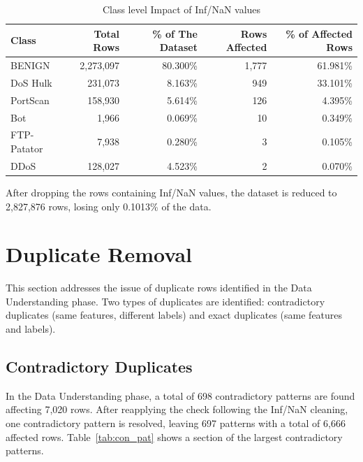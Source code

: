 \documentclass[12pt,a4paper]{article}
\begin{document}
\begin{table}[H]
    \centering
    \caption{Class level Impact of Inf/NaN values}
    \vskip0.1cm
    \label{tab:nan_inf}
    \begin{tabular}{|l|r|r|r|r|}
        \hline
        \textbf{Class} & \textbf{Total Rows} & \textbf{\% of The Dataset} & \textbf{Rows Affected} & \textbf{\% of Affected Rows} \\
        \hline
        BENIGN         & 2,273,097           & 80.300\%                   & 1,777                  & 61.981\%                     \\
        \hline
        DoS Hulk       & 231,073             & 8.163\%                    & 949                    & 33.101\%                     \\
        \hline
        PortScan       & 158,930             & 5.614\%                    & 126                    & 4.395\%                      \\
        \hline
        Bot            & 1,966               & 0.069\%                    & 10                     & 0.349\%                      \\
        \hline
        FTP-Patator    & 7,938               & 0.280\%                    & 3                      & 0.105\%                      \\
        \hline
        DDoS           & 128,027             & 4.523\%                    & 2                      & 0.070\%                      \\
        \hline
    \end{tabular}
\end{table}

After dropping the rows containing Inf/NaN values, the dataset is reduced to
2,827,876 rows, losing only 0.1013\% of the data.

\section{Duplicate Removal}
This section addresses the issue of duplicate rows identified in the Data Understanding phase. Two types of duplicates are identified: contradictory duplicates (same features, different labels) and exact duplicates (same features and labels).

\subsection{Contradictory Duplicates}
In the Data Understanding phase, a total of 698 contradictory patterns are found affecting 7,020 rows. After reapplying the check following the Inf/NaN cleaning, one contradictory pattern is resolved, leaving 697 patterns with a total of 6,666 affected rows. Table~\ref{tab:con_pat} shows a section of the largest contradictory patterns.
\end{document}

